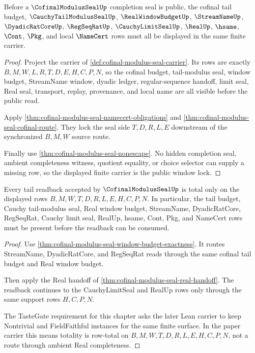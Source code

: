 \begin{theorem}
\label{thm:cofinal-modulus-seal-window-lock}
Before a $\CofinalModulusSealUp$ completion seal is public, the cofinal tail budget, $\CauchyTailModulusSealUp$, $\RealWindowBudgetUp$, $\StreamNameUp$, $\DyadicRatCoreUp$, $\RegSeqRatUp$, $\CauchyLimitSealUp$, $\RealUp$, $\hsame$, $\Cont$, $\Pkg$, and local $\NameCert$ rows must all be displayed in the same finite carrier.
\end{theorem}
\begin{proof}
Project the carrier of \autoref{def:cofinal-modulus-seal-carrier}. Its rows are exactly $B,M,W,L,R,T,D,E,H,C,P,N$, so the cofinal budget, tail-modulus seal, window budget, StreamName window, dyadic ledger, regular-sequence handoff, limit seal, Real seal, transport, replay, provenance, and local name are all visible before the public read.

Apply \autoref{thm:cofinal-modulus-seal-namecert-obligations} and \autoref{thm:cofinal-modulus-seal-cofinal-route}. They lock the seal side $T,D,R,L,E$ downstream of the synchronized $B,M,W$ source route.

Finally use \autoref{thm:cofinal-modulus-seal-nonescape}. No hidden completion seal, ambient completeness witness, quotient equality, or choice selector can supply a missing row, so the displayed finite carrier is the public window lock.
\end{proof}

\begin{theorem}
\label{thm:cofinal-modulus-seal-tail-readback-totality}
Every tail readback accepted by $\CofinalModulusSealUp$ is total only on the displayed rows $B,M,W,T,D,R,L,E,H,C,P,N$. In particular, the tail budget, Cauchy tail-modulus seal, Real window budget, StreamName, DyadicRatCore, RegSeqRat, Cauchy limit seal, RealUp, hsame, Cont, Pkg, and NameCert rows must be present before the readback can be consumed.
\end{theorem}
\begin{proof}
Use \autoref{thm:cofinal-modulus-seal-window-budget-exactness}. It routes StreamName, DyadicRatCore, and RegSeqRat reads through the same cofinal tail budget and Real window budget.

Then apply the Real handoff of \autoref{thm:cofinal-modulus-seal-real-handoff}. The readback continues to the CauchyLimitSeal and RealUp rows only through the same support rows $H,C,P,N$.

The TasteGate requirement for this chapter asks the later Lean carrier to keep Nontrivial and FieldFaithful instances for the same finite surface. In the paper carrier this means totality is row-total on $B,M,W,T,D,R,L,E,H,C,P,N$, not a route through ambient Real completeness.
\end{proof}

